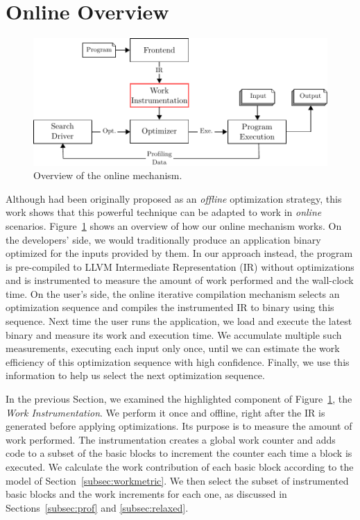 \section{Online {\IterComp} Overview} \label{sec:oic-infra}

    \begin{figure}[t]
        \centering
        \includegraphics[width=\linewidth]{figs/infra-diagram}
        \caption{Overview of the online \itercomp mechanism.}
        \label{fig:infra-diagram}
    \end{figure}

    Although {\itercomp} had been originally proposed as an \textit{offline} optimization strategy, this work shows that this powerful
    technique can be adapted to work in \textit{online} scenarios. Figure~\ref{fig:infra-diagram} shows an overview of how our online
    {\itercomp} mechanism works. On the developers' side, we would traditionally produce an application binary optimized for the inputs
    provided by them. In our approach instead, the program is pre-compiled to LLVM Intermediate Representation (IR) without optimizations
    and is instrumented to measure the amount of work performed and the wall-clock time.
    On the user's side, the online iterative compilation mechanism selects an optimization sequence and compiles the instrumented IR to binary using this sequence.
    Next time the user runs the application, we load and execute the latest binary and measure its work and execution time. We accumulate
    multiple such measurements, executing each input only once, until we can estimate the work efficiency of this optimization sequence
    with high confidence. Finally, we use this information to help us select the next optimization sequence.
    
    In the previous Section, we examined the highlighted component of Figure~\ref{fig:infra-diagram}, the \textit{Work Instrumentation}.
    We perform it once and offline, right after the IR is generated before applying optimizations. Its purpose is to measure the amount of
    work performed. The instrumentation creates a global work counter and adds code to a subset of the basic blocks to increment the counter
    each time a block is executed. We calculate the work contribution of each basic block according to the model of Section~\ref{subsec:workmetric}.
    We then select the subset of instrumented basic blocks and the work increments for each one, as discussed in Sections~\ref{subsec:prof}
    and \ref{subsec:relaxed}.
    
